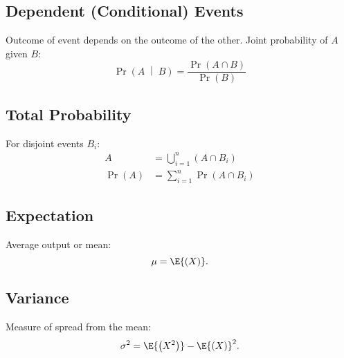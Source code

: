 \documentclass{article}
\begin{document}
\begin{multicols}{3}
    \subsection*{Dependent (Conditional) Events}
    Outcome of event depends on the outcome of the other. Joint probability of $A$ given $B$:
    \begin{equation*}
        \Pr{\left(A \;\middle|\; B\right)} = \frac{\Pr{\left( A \cap B \right)}}{\Pr{\left( B \right)}}
    \end{equation*}
    \subsection*{Total Probability}
    For disjoint events $B_i$:
    \begin{align*}
        A                     & = \bigcup\limits_{i=1}^n \left( A \cap B_i \right) \\
        \Pr{\left( A \right)} & = \sum_{i=1}^n \Pr{\left( A \cap B_i \right)}
    \end{align*}
    \subsection*{Expectation}
    Average output or mean:
    \begin{equation*}
        \mu = \E{\left( X \right)}.
    \end{equation*}
    \subsection*{Variance}
    Measure of spread from the mean:
    \begin{equation*}
        \sigma^2 = \E{\left( X^2 \right)} - \E{\left( X \right)}^2.
    \end{equation*}
\end{multicols}
\end{document}
